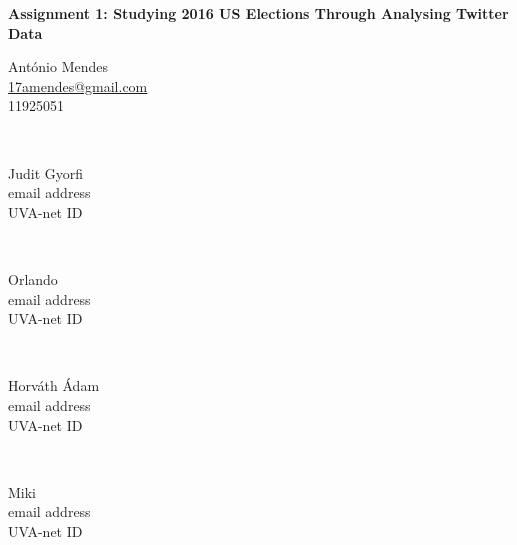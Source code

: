 \documentclass{article}
\newcommand\email[1]{
    \href{mailto:#1}{\url{#1}}
}
\begin{document}
\begin{titlepage}
  \newcommand{\HRule}{\rule{\linewidth{0.5mm}}}

    \begin{center}
      \vspace{0.5 cm}
      \huge{\bfseries Assignment 1: Studying 2016 US Elections Through
        Analysing Twitter Data}
      \\[1.2 cm]
      \begin{minipage}{0.45\textwidth}
        \begin{flushleft}
        \large
        António Mendes\\
        {\small\email{17amendes@gmail.com}} \\
        {\small 11925051}
        \end{flushleft}
      \end{minipage}
      ~
      \begin{minipage}{0.4\textwidth}
        \begin{flushright}
          \large
          Judit Gyorfi\\
          {\small email address}\\
          {\small UVA-net ID}
        \end{flushright}
      \end{minipage}
      \\[1cm]
      \begin{minipage}{0.45\textwidth}
        \begin{flushleft}
        \large
        Orlando\\
        {\small email address}\\
        {\small UVA-net ID}
        \end{flushleft}
      \end{minipage}
      ~
      \begin{minipage}{0.4\textwidth}
        \begin{flushright}
          \large
          Horváth Ádam\\
          {\small email address}\\
          {\small UVA-net ID}
        \end{flushright}
      \end{minipage}
      \\[1cm]
      \begin{minipage}{0.5\textwidth}
        \begin{center}
          \large
          Miki\\
          {\small email address}\\
          {\small UVA-net ID}
        \end{center}
      \end{minipage}
      \vfill
      \vfill
      \vfill
    \end{center}
  \end{titlepage}
\end{document}
